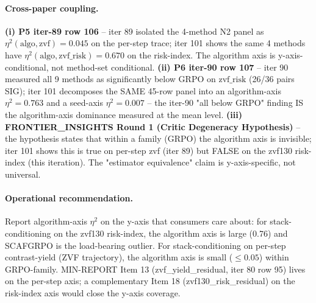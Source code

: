 \paragraph{Cross-paper coupling.}
\textbf{(i) P5 iter-89 row 106} -- iter 89 isolated the 4-method
N2 panel as $\eta^2(\mathrm{algo}, \mathrm{zvf}) = 0.045$ on the
per-step trace; iter 101 shows the same 4 methods have
$\eta^2(\mathrm{algo}, \mathrm{zvf\_risk}) = 0.670$ on the
risk-index. The algorithm axis is y-axis-conditional, not method-set
conditional. \textbf{(ii) P6 iter-90 row 107} -- iter 90 measured
all 9 methods as significantly below GRPO on $\mathrm{zvf\_risk}$
(26/36 pairs SIG); iter 101 decomposes the SAME 45-row panel
into an algorithm-axis $\eta^2 = 0.763$ and a seed-axis
$\eta^2 = 0.007$ -- the iter-90 "all below GRPO" finding IS the
algorithm-axis dominance measured at the mean level. \textbf{(iii)
FRONTIER\_INSIGHTS Round 1 (Critic Degeneracy Hypothesis)} -- the
hypothesis states that within a family (GRPO) the algorithm axis
is invisible; iter 101 shows this is true on per-step zvf (iter
89) but FALSE on the zvf130 risk-index (this iteration). The
"estimator equivalence" claim is y-axis-specific, not universal.

\paragraph{Operational recommendation.}
Report algorithm-axis $\eta^2$ on the y-axis that consumers
care about: for stack-conditioning on the zvf130 risk-index,
the algorithm axis is large (0.76) and SCAFGRPO is the
load-bearing outlier. For stack-conditioning on per-step
contrast-yield (ZVF trajectory), the algorithm axis is small
($\leq 0.05$) within GRPO-family. MIN-REPORT Item 13
(zvf\_yield\_residual, iter 80 row 95) lives on the per-step
axis; a complementary Item 18 (zvf130\_risk\_residual) on the
risk-index axis would close the y-axis coverage.

%
